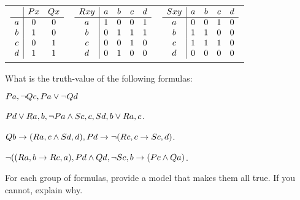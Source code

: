 \documentclass[PHIL101-Textbook.tex]{subfiles}
\begin{document}
\begin{center}
  \begin{tabular}{ccc}
$\begin{array}{c|cc}
	 & \mathord{P}{x} & \mathord{Q}{x}\\ \hline
   a &0 & 0\\
   b &1 & 0\\
   c &0 & 1\\
   d &1 & 1\\ 
 \end{array}$
   &
$\begin{array}{c|cccc}
	\mathord{R}{x y} & a & b & c & d\\ \hline
	a & 1 & 0 & 0 & 1 \\
	b & 0 & 1 & 1 & 1\\
	c & 0 & 0 & 1 & 0\\
	d & 0 & 1 & 0 & 0	
 \end{array}$
	&
$\begin{array}{c|cccc}
	\mathord{S}{x y} & a & b & c & d\\ \hline
	a & 0 & 0 & 1 & 0 \\
	b & 1 & 1 & 0& 0\\
	c & 1 & 1 & 1 & 0\\
	d & 0 & 0 & 0 & 0	
\end{array}$
\end{tabular}
\end{center}

\noindent What is the truth-value of the following formulas:

\begin{earg}
\item $\mathord{P}{a}, \neg \mathord{Q}{c}, \mathord{P}{a} \vee \neg \mathord{Q}{d}$
\item $\mathord{P}{d} \vee \mathord{R}{a,b}, \neg \mathord{P}{a} \land \mathord{S}{c,c}, \mathord{S}{d,b} \vee \mathord{R}{a,c}$.
\item $\mathord{Q}{b} \rightarrow (\mathord{R}{a,c}\land \mathord{S}{d,d}), \mathord{P}{d} \rightarrow \neg (\mathord{R}{c,c}\rightarrow\mathord{S}{c,d})$.
\item $\neg((\mathord{R}{a,b}\rightarrow \mathord{R}{c,a}), \mathord{P}{d} \land \mathord{Q}{d}, \neg \mathord{S}{c,b} \rightarrow (\mathord{P}{c} \land \mathord{Q}{a})$.
\end{earg}

\noindent \problempart
\label{pr.relation-tables-3}
For each group of formulas, provide a model that makes them all true. If you cannot, explain why. 
\end{document}
